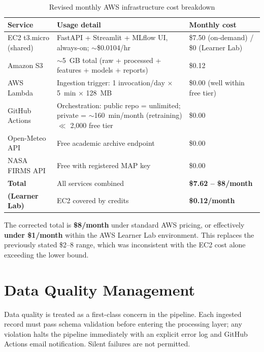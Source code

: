 \documentclass[12pt,a4paper]{report}
\begin{document}
\begin{table}[H]
\centering
\caption{Revised monthly AWS infrastructure cost breakdown}
\label{tab:cost_revised}
\begin{tabularx}{\textwidth}{@{}p{3.2cm}Xp{3.8cm}@{}}
\toprule
\textbf{Service} & \textbf{Usage detail} & \textbf{Monthly cost} \\
\midrule
EC2 t3.micro (shared) & FastAPI + Streamlit + MLflow UI, always-on; $\sim$\$0.0104/hr & \$7.50 (on-demand) / \$0 (Learner Lab) \\[4pt]
Amazon S3             & $\sim$5~GB total (raw + processed + features + models + reports) & \$0.12 \\[4pt]
AWS Lambda            & Ingestion trigger: 1 invocation/day $\times$ 5~min $\times$ 128~MB & \$0.00 (well within free tier) \\[4pt]
GitHub Actions        & Orchestration: public repo = unlimited; private = $\sim$160~min/month (retraining) $\ll$ 2,000 free tier & \$0.00 \\[4pt]
Open-Meteo API        & Free academic archive endpoint                        & \$0.00 \\[4pt]
NASA FIRMS API        & Free with registered MAP key                          & \$0.00 \\[4pt]
\midrule
\textbf{Total}        & All services combined                                 & \textbf{\$7.62 -- \$8/month} \\
\textbf{(Learner Lab)}& EC2 covered by credits                                & \textbf{\$0.12/month} \\
\bottomrule
\end{tabularx}
\end{table}

The corrected total is \textbf{\$8/month} under standard AWS pricing, or effectively \textbf{under \$1/month} within the AWS Learner Lab environment. This replaces the previously stated \$2--8 range, which was inconsistent with the EC2 cost alone exceeding the lower bound.

\section{Data Quality Management}

Data quality is treated as a first-class concern in the pipeline. Each ingested record must pass schema validation before entering the processing layer; any violation halts the pipeline immediately with an explicit error log and GitHub Actions email notification. Silent failures are not permitted.
\end{document}
